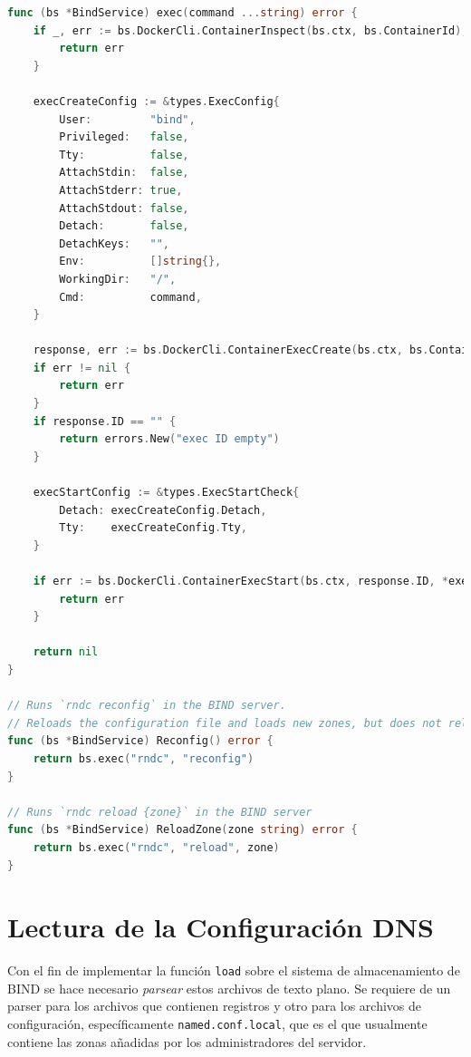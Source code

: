 \begin{lstlisting}[frame=single, language=Go, caption=Métodos para actualizar a BIND con los cambios en sus archivos.]
    func (bs *BindService) exec(command ...string) error {
    if _, err := bs.DockerCli.ContainerInspect(bs.ctx, bs.ContainerId); err != nil {
        return err
    }

    execCreateConfig := &types.ExecConfig{
        User:         "bind",
        Privileged:   false,
        Tty:          false,
        AttachStdin:  false,
		AttachStderr: true,
        AttachStdout: false,
		Detach:       false,
        DetachKeys:   "",
        Env:          []string{},
        WorkingDir:   "/",
        Cmd:          command,
    }

    response, err := bs.DockerCli.ContainerExecCreate(bs.ctx, bs.ContainerId, *execCreateConfig)
    if err != nil {
        return err
    }
    if response.ID == "" {
        return errors.New("exec ID empty")
    }

    execStartConfig := &types.ExecStartCheck{
        Detach: execCreateConfig.Detach,
        Tty:    execCreateConfig.Tty,
    }

    if err := bs.DockerCli.ContainerExecStart(bs.ctx, response.ID, *execStartConfig); err != nil {
        return err
    }

    return nil
}

// Runs `rndc reconfig` in the BIND server.
// Reloads the configuration file and loads new zones, but does not reload existing zone files even if they have changed.
func (bs *BindService) Reconfig() error {
	return bs.exec("rndc", "reconfig")
}

// Runs `rndc reload {zone}` in the BIND server
func (bs *BindService) ReloadZone(zone string) error {
	return bs.exec("rndc", "reload", zone)
}
\end{lstlisting}

\section{Lectura de la Configuración DNS}

Con el fin de implementar la función \verb+load+ sobre el sistema de almacenamiento de BIND se hace necesario \textit{parsear} estos archivos de texto plano. Se requiere de un parser para los archivos que contienen registros y otro para los archivos de configuración, específicamente \verb+named.conf.local+, que es el que usualmente contiene las zonas añadidas por los administradores del servidor.

